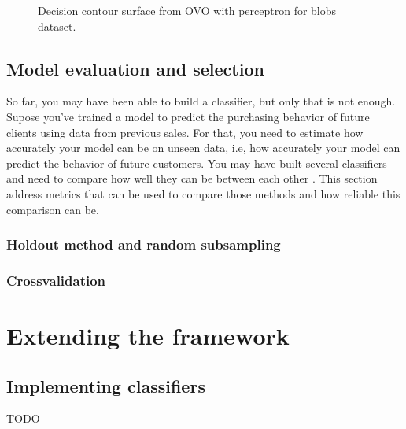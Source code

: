 \documentclass[letterpaper,10pt,english]{sphinxmanual}
\let\sphinxpxdimen\pdfpxdimen\else\newdimen\sphinxpxdimen
\begin{document}
\begin{figure}[htbp]
\centering
\capstart

\noindent\sphinxincludegraphics[width=450\sphinxpxdimen]{{contour-blobs-ovo}.png}
\caption{Decision contour surface from OVO with perceptron for blobs dataset.}\label{\detokenize{getting_started/classification:blobs-contour-ovo-perc}}\end{figure}


\section{Model evaluation and selection}
\label{\detokenize{getting_started/classification:model-evaluation-and-selection}}
\sphinxAtStartPar
So far, you may have been able to build a classifier, but only that is not enough. Supose you’ve trained a model to predict the purchasing behavior of future clients using data from
previous sales. For that, you need to estimate how accurately your model can be on unseen data, i.e, how accurately your model can predict the behavior of future customers. You may have built
several classifiers and need to compare how well they can be between each other . This section address metrics that can be used to compare those methods and how reliable this comparison can be.


\subsection{Holdout method and random subsampling}
\label{\detokenize{getting_started/classification:holdout-method-and-random-subsampling}}

\subsection{Cross\sphinxhyphen{}validation}
\label{\detokenize{getting_started/classification:cross-validation}}

\chapter{Extending the framework}
\label{\detokenize{contribute/extending:extending-the-framework}}\label{\detokenize{contribute/extending::doc}}

\section{Implementing classifiers}
\label{\detokenize{contribute/extending:implementing-classifiers}}
\sphinxAtStartPar
TODO
\end{document}
